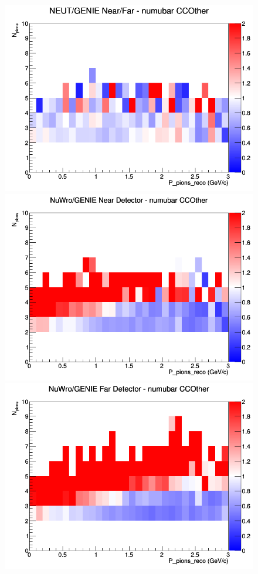 \documentclass[12pt]{article}
\begin{document}
\begin{figure}[h]
\endminipage
{}
\includegraphics[width=\linewidth]{eff_N_P/FGT/pions/ratios/CCOther_NEUT_GENIE_numubar_NF_N_P.png}
\endminipage
\newline
{}
\includegraphics[width=\linewidth]{eff_N_P/FGT/pions/ratios/CCOther_NuWro_GENIE_numubar_near_N_P.png}
\endminipage
{}
\includegraphics[width=\linewidth]{eff_N_P/FGT/pions/ratios/CCOther_NuWro_GENIE_numubar_far_N_P.png}

\end{figure}
\end{document}
